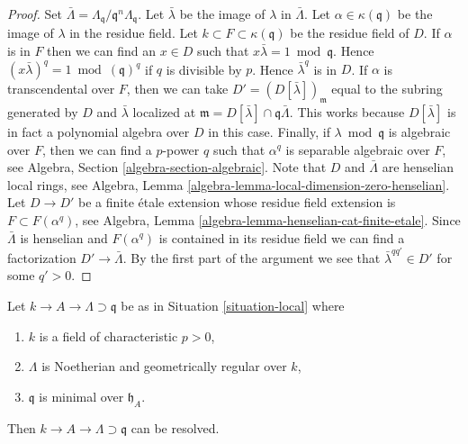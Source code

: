 \begin{proof}
Set $\bar \Lambda = \Lambda_\mathfrak q/\mathfrak q^n\Lambda_\mathfrak q$.
Let $\bar \lambda$ be the image of $\lambda$ in $\bar \Lambda$.
Let $\alpha \in \kappa(\mathfrak q)$ be the image of $\lambda$ in the
residue field.
Let $k \subset F \subset \kappa(\mathfrak q)$ be the residue field of $D$.
If $\alpha$ is in $F$ then we can find an
$x \in D$ such that $x \bar\lambda = 1 \bmod \mathfrak q$. Hence
$(x \bar \lambda)^q = 1 \bmod (\mathfrak q)^q$ if $q$ is divisible by $p$.
Hence $\bar\lambda^q$ is in $D$. If $\alpha$ is
transcendental over $F$, then we can take $D' = (D[\bar \lambda])_\mathfrak m$
equal to the subring generated by $D$ and $\bar \lambda$ localized
at $\mathfrak m = D[\bar \lambda] \cap \mathfrak q \bar \Lambda$.
This works because $D[\bar \lambda]$ is in fact a polynomial algebra
over $D$ in this case. Finally, if $\lambda \bmod \mathfrak q$ is
algebraic over $F$, then we can find a $p$-power $q$ such that
$\alpha^q$ is separable algebraic over $F$, see
Algebra, Section \ref{algebra-section-algebraic}.
Note that $D$ and $\bar\Lambda$ are henselian local rings, see
Algebra, Lemma \ref{algebra-lemma-local-dimension-zero-henselian}.
Let $D \to D'$ be a finite \'etale extension
whose residue field extension is $F \subset F(\alpha^q)$, see
Algebra, Lemma \ref{algebra-lemma-henselian-cat-finite-etale}.
Since $\bar\Lambda$ is henselian and $F(\alpha^q)$ is contained
in its residue field we can find a factorization
$D' \to \bar \Lambda$. By the first part of the argument
we see that $\bar\lambda^{qq'} \in D'$ for some $q' > 0$.
\end{proof}

\begin{lemma}
\label{lemma-resolve-general}
Let $k \to A \to \Lambda \supset \mathfrak q$ be as in
Situation \ref{situation-local} where
\begin{enumerate}
\item $k$ is a field of characteristic $p > 0$,
\item $\Lambda$ is Noetherian and geometrically regular over $k$,
\item $\mathfrak q$ is minimal over $\mathfrak h_A$.
\end{enumerate}
Then $k \to A \to \Lambda \supset \mathfrak q$ can be resolved.
\end{lemma}

